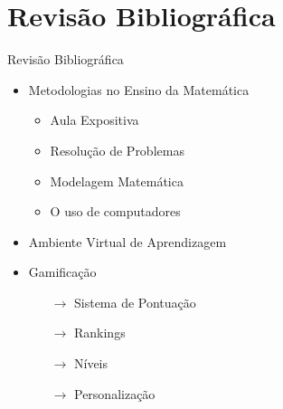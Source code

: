 \documentclass[aspectratio=169]{beamer}
\begin{document}
\section{Revisão Bibliográfica}

\begin{frame}{Revisão Bibliográfica}

\begin{itemize}
\item Metodologias no Ensino da Matemática
	\begin{itemize}
		\item Aula Expositiva
		\item Resolução de Problemas
		\item Modelagem Matemática
		\item O uso de computadores
	\end{itemize}
\item Ambiente Virtual de Aprendizagem
\item Gamifica\c{c}\~ao
	\begin{itemize}
	\item[$\longrightarrow$] Sistema de Pontua\c{c}\~ao
	\item[$\longrightarrow$] Rankings
	\item[$\longrightarrow$] N\'iveis
	\item[$\longrightarrow$] Personalização
	\end{itemize}

\end{itemize}


\end{frame}
\end{document}
